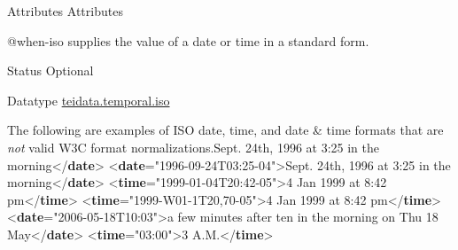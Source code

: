 \begin{reflist}
    \item[{Attributes}]
  Attributes\hfil\\[-10pt]\begin{sansreflist}
    \item[@when-iso]
  supplies the value of a date or time in a standard form.
\begin{reflist}
    \item[{Status}]
  Optional
    \item[{Datatype}]
  \hyperref[TEI.teidata.temporal.iso]{teidata.temporal.iso}
    \item[]The following are examples of ISO date, time, and date \& time formats that are \textit{not} valid W3C format normalizations.Sept. 24th, 1996 at 3:25 in the morning{</\textbf{date}>}\mbox{}\newline 
{<\textbf{date}\hspace*{1em}{when-iso}="{1996-09-24T03:25-04}">}Sept. 24th, 1996 at 3:25 in the morning{</\textbf{date}>}\mbox{}\newline 
{<\textbf{time}\hspace*{1em}{when-iso}="{1999-01-04T20:42-05}">}4 Jan 1999 at 8:42 pm{</\textbf{time}>}\mbox{}\newline 
{<\textbf{time}\hspace*{1em}{when-iso}="{1999-W01-1T20,70-05}">}4 Jan 1999 at 8:42 pm{</\textbf{time}>}\mbox{}\newline 
{<\textbf{date}\hspace*{1em}{when-iso}="{2006-05-18T10:03}">}a few minutes after ten in the morning on Thu 18 May{</\textbf{date}>}\mbox{}\newline 
{<\textbf{time}\hspace*{1em}{when-iso}="{03:00}">}3 A.M.{</\textbf{time}>}\mbox{}\newline 

\end{reflist}
\end{sansreflist}
\end{reflist}
